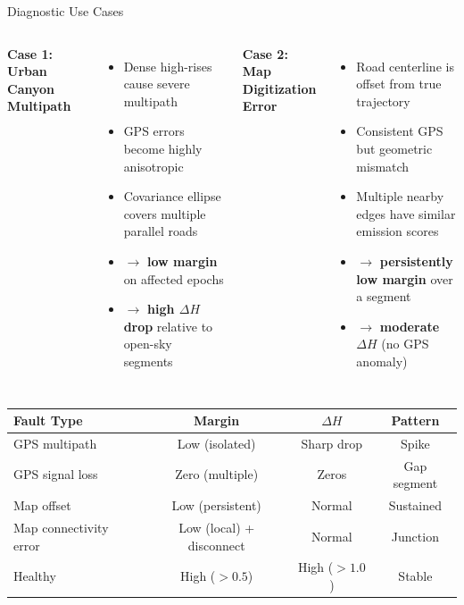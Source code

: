 \documentclass[10pt,aspectratio=169]{beamer}
\begin{document}

\begin{frame}{Diagnostic Use Cases}
  \begin{columns}[T]
      \textbf{Case 1: Urban Canyon Multipath}
      \begin{itemize}
        \item Dense high-rises cause severe multipath
        \item GPS errors become highly anisotropic
        \item Covariance ellipse covers multiple parallel roads
        \item $\to$ \textbf{low margin} on affected epochs
        \item $\to$ \textbf{high $\Delta H$ drop} relative to open-sky segments
      \end{itemize}

      \textbf{Case 2: Map Digitization Error}
      \begin{itemize}
        \item Road centerline is offset from true trajectory
        \item Consistent GPS but geometric mismatch
        \item Multiple nearby edges have similar emission scores
        \item $\to$ \textbf{persistently low margin} over a segment
        \item $\to$ \textbf{moderate $\Delta H$} (no GPS anomaly)
      \end{itemize}
  \end{columns}

  \vspace{0.4cm}
  \begin{center}
  \begin{tabular}{lccc}
    \toprule
    Fault Type & Margin & $\Delta H$ & Pattern \\
    \midrule
    GPS multipath & Low (isolated) & Sharp drop & Spike \\
    GPS signal loss & Zero (multiple) & Zeros & Gap segment \\
    Map offset & Low (persistent) & Normal & Sustained \\
    Map connectivity error & Low (local) + disconnect & Normal & Junction \\
    Healthy & High ($>0.5$) & High ($>1.0$) & Stable \\
    \bottomrule
  \end{tabular}
  \end{center}
\end{frame}
\end{document}
